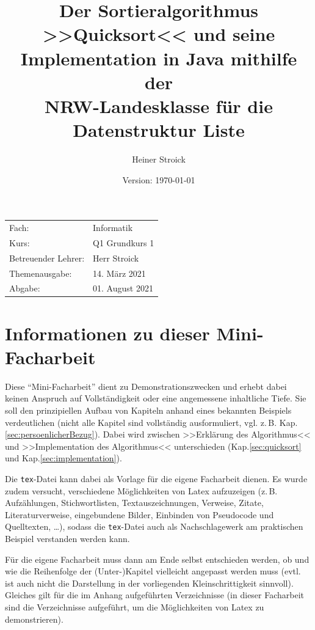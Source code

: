 \documentclass[11pt, a4paper, oneside, openright]{article}
\title{Der Sortieralgorithmus >>Quicksort<< und seine Implementation in Java mithilfe der\\ NRW-Landesklasse für die Datenstruktur Liste}
\author{Heiner Stroick}
\date{Version: \today}
\newcommand \zB{z.\,B.\xspace }
\newcommand \evtl{evtl.\xspace }
\newcommand \vgl{vgl.\xspace }
\newcommand \Kap{Kap.\xspace }
\begin{document}
\maketitle
\thispagestyle{empty}

\vfill

\noindent
\begin{tabular}{p{4cm}l}
    Fach:                   & Informatik \tabularnewline
    Kurs:                   & Q1 Grundkurs 1 \tabularnewline
    Betreuender Lehrer:     & Herr Stroick \tabularnewline
    Themenausgabe:          & 14. März 2021 \tabularnewline
    Abgabe:                 & 01. August 2021 \tabularnewline
\end{tabular}





\newpage
\setcounter{page}{1}
\tableofcontents





\newpage
\section{Informationen zu dieser Mini-Facharbeit}
Diese \enquote{Mini-Facharbeit} dient zu Demonstrationszwecken und erhebt dabei  keinen Anspruch auf Vollständigkeit oder eine angemessene inhaltliche Tiefe. Sie soll den prinzipiellen Aufbau von Kapiteln anhand eines bekannten Beispiels verdeutlichen (nicht alle Kapitel sind vollständig ausformuliert, \vgl\zB\Kap\ref{sec:persoenlicherBezug}). Dabei wird zwischen >>Erklärung des Algorithmus<< und >>Implementation des Algorithmus<< unterschieden (\Kap\ref{sec:quicksort} und \Kap\ref{sec:implementation}).

Die \texttt{tex}-Datei kann dabei als Vorlage für die eigene Facharbeit dienen. Es wurde zudem versucht, verschiedene Möglichkeiten von Latex aufzuzeigen (\zB Aufzählungen, Stichwortlisten, Textauszeichnungen, Verweise, Zitate, Literaturverweise, eingebundene Bilder, Einbinden von Pseudocode und Quelltexten, \ldots), sodass die \texttt{tex}-Datei auch als Nachschlagewerk am praktischen Beispiel verstanden werden kann.

Für die eigene Facharbeit muss dann am Ende selbst entschieden werden, ob und wie die Reihenfolge der (Unter-)Kapitel vielleicht angepasst werden muss (\evtl ist auch nicht die Darstellung in der vorliegenden Kleinschrittigkeit sinnvoll). Gleiches gilt für die im Anhang aufgeführten Verzeichnisse (in dieser Facharbeit sind die Verzeichnisse aufgeführt, um die Möglichkeiten von Latex zu demonstrieren).
\end{document}
